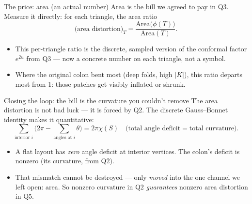 \documentclass[aspectratio=169,10pt]{beamer}
\begin{document}
\begin{frame}{The price: area (an actual number)}
  Area is the bill we agreed to pay in Q3. Measure it directly: for each triangle, the area ratio
  \[
    \text{(area distortion)}_T=\frac{\text{Area}\big(\phi(T)\big)}{\text{Area}(T)} .
  \]
  \begin{itemize}
    \item This per-triangle ratio is the discrete, sampled version of the conformal factor $e^{2u}$ from Q3 --- now a concrete number on each triangle, not a symbol.
    \item Where the original colon bent most (deep folds, high $|K|$), this ratio departs most from $1$: those patches get visibly inflated or shrunk.
  \end{itemize}
\end{frame}

\begin{frame}{Closing the loop: the bill is the curvature you couldn't remove}
  The area distortion is not bad luck --- it is forced by Q2. The discrete Gauss--Bonnet identity makes it quantitative:
  \[
    \sum_{\text{interior } i}\Big(2\pi-\!\!\sum_{\text{angles at }i}\!\!\theta\Big)=2\pi\chi(S)\quad\text{(total angle deficit}=\text{total curvature)} .
  \]
  \begin{itemize}
    \item A flat layout has \emph{zero} angle deficit at interior vertices. The colon's deficit is nonzero (its curvature, from Q2).
    \item That mismatch cannot be destroyed --- only \emph{moved} into the one channel we left open: area. So nonzero curvature in Q2 \emph{guarantees} nonzero area distortion in Q5.
  \end{itemize}
\end{frame}
\end{document}
